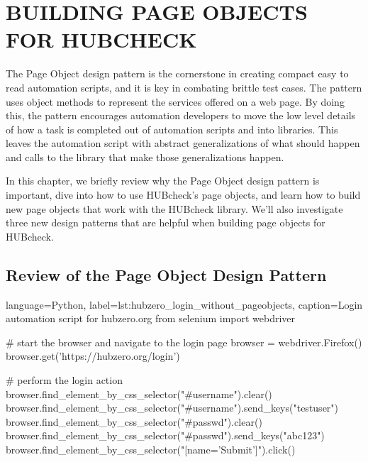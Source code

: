 
\chapter{BUILDING PAGE OBJECTS FOR HUBCHECK}
\label{chap:page_objects}


The Page Object design pattern is the cornerstone in creating compact easy to
read automation scripts, and it is key in combating brittle test cases. The
pattern uses object methods to represent the services offered on a web page. By
doing this, the pattern encourages automation developers to move the low level
details of how a task is completed out of automation scripts and into
libraries. This leaves the automation script with abstract generalizations of
what should happen and calls to the library that make those generalizations
happen.

In this chapter, we briefly review why the Page Object design pattern is
important, dive into how to use HUBcheck's page objects, and learn how to build
new page objects that work with the HUBcheck library. We'll also investigate
three new design patterns that are helpful when building page objects for
HUBcheck.

\section{Review of the Page Object Design Pattern}
\label{sec:review_page_object_design_pattern}

\begin{xcode}{%
  language=Python,%
  label=lst:hubzero_login_without_pageobjects,%
  caption={Login automation script for hubzero.org}%
}
from selenium import webdriver

# start the browser and navigate to the login page
browser = webdriver.Firefox()
browser.get('https://hubzero.org/login')

# perform the login action
browser.find_element_by_css_selector("#username").clear()
browser.find_element_by_css_selector("#username").send_keys("testuser")
browser.find_element_by_css_selector("#passwd").clear()
browser.find_element_by_css_selector("#passwd").send_keys("abc123")
browser.find_element_by_css_selector("[name='Submit']").click()
\end{xcode}

